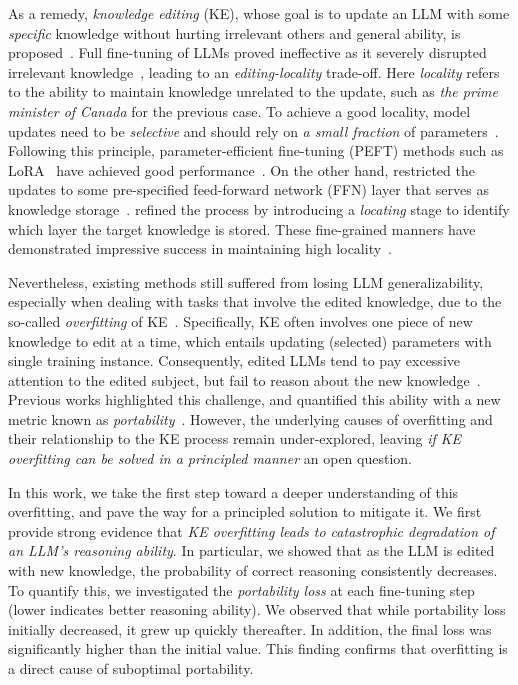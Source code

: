 As a remedy, 
\textit{knowledge editing} (KE), whose goal is to update an LLM with some \textit{specific} knowledge without hurting irrelevant others and general ability, is proposed~\citep{wang2023knowledge, zhang2024comprehensive}.
Full fine-tuning of LLMs proved ineffective as it severely disrupted irrelevant knowledge~\citep{wang2023knowledge}, leading to an \textit{editing-locality} trade-off. 
Here \textit{locality} refers to the ability to maintain knowledge unrelated to the update, such as \textit{the prime minister of Canada} for the previous case.
To achieve a good locality, model updates need to be \textit{selective} and should rely on \textit{a small fraction} of parameters~\citep{wang2023knowledge}.
Following this principle, parameter-efficient fine-tuning (PEFT) methods such as LoRA~\citep{hu2021lora} have achieved good performance~\citep{wu2023eva}.
On the other hand, \citet{huang2023transformer, dong2022calibrating} restricted the updates to some pre-specified feed-forward network (FFN) layer that serves as knowledge storage~\citep{dai2021knowledge}.
\citet{meng2022locating, meng2022mass} refined the process by introducing a \textit{locating} stage to {identify} which layer the target knowledge is stored. These fine-grained manners have demonstrated impressive success in maintaining high locality~\citep{zhang2024comprehensive}. 




Nevertheless, 
existing methods still suffered from losing LLM generalizability, 
especially when dealing with tasks that involve the edited knowledge, 
due to the so-called \textit{overfitting} of KE~\citep{zhang2024uncovering}. 
Specifically, 
KE often involves one piece of new knowledge to edit at a time, which entails updating (selected) parameters with single training instance. 
Consequently, edited LLMs tend to pay excessive attention to the edited subject, but fail to reason about the new knowledge~\citep{zhong2023mquake,zhang2024uncovering}. 
Previous works highlighted this challenge, and quantified this ability with a new metric known as \textit{portability}~\citep{zhong2023mquake,wang2024deepedit}. 
However, the underlying causes of overfitting and their relationship to the KE process remain under-explored, 
leaving \textit{if KE overfitting can be solved in a principled manner} an open question. 



In this work,
we take the first step toward a deeper understanding of this overfitting, 
and pave the way for a principled solution to mitigate it. 
We first provide strong evidence that \textit{KE overfitting leads to catastrophic degradation of an LLM's reasoning ability}.
In particular, we showed that as the LLM is edited with new knowledge, 
the probability of correct reasoning consistently decreases.
To quantify this, we investigated the \textit{portability loss} at each fine-tuning step (lower indicates better reasoning ability).
We observed that while portability loss initially decreased, it grew up quickly thereafter. 
In addition, the final loss was significantly higher than the initial value. 
This finding confirms that {overfitting is a direct cause of suboptimal portability}. 

